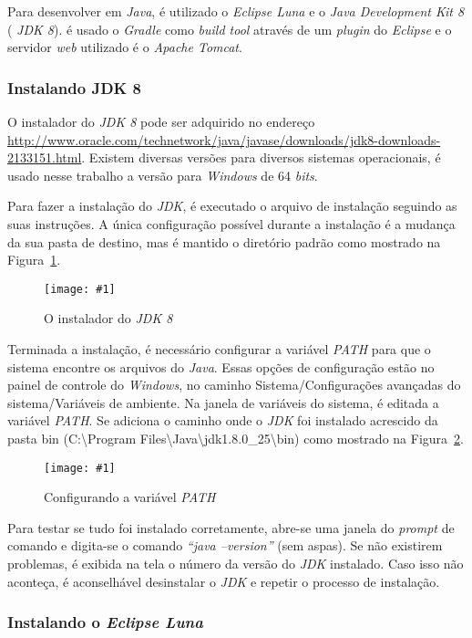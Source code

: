 \documentclass[a4paper,12pt]{article}
\newcommand{\figura}[3] {
	\begin{figure}[ht]
		\centering
		\texttt{[image: \#1]}
		\caption{#2}
		\label{#3}
	\end{figure}
	\FloatBarrier
}
\newcommand{\est}[1] {
\textit{#1}}
\newcommand{\sigla}[1] {
\textit{#1}}
\newcommand{\lang}[1] {
\textit{#1}}
\begin{document}
Para desenvolver em \lang{Java}, é utilizado o \est{Eclipse Luna} e o \est{Java Development Kit 8} (\sigla{JDK 8}). é usado o \est{Gradle} como \est{build tool} através de um \est{plugin} do \est{Eclipse} e o servidor \est{web} utilizado é o \est{Apache Tomcat}.

\subsubsection{Instalando JDK 8}

O instalador do \sigla{JDK 8} pode ser adquirido no endereço \url{http://www.oracle.com/technetwork/java/javase/downloads/jdk8-downloads-2133151.html}. Existem diversas versões para diversos sistemas operacionais, é usado nesse trabalho a versão para \est{Windows} de 64 \est{bits}. 

Para fazer a instalação do \sigla{JDK}, é executado o arquivo de instalação seguindo as suas instruções. A única configuração possível durante a instalação é a mudança da sua pasta de destino, mas é mantido o diretório padrão como mostrado na Figura~\ref{fig:jdk1}.

\figura{jdk81.jpg}{O instalador do \sigla{JDK 8}}{fig:jdk1}

Terminada a instalação, é necessário configurar a variável \est{PATH} para que o sistema encontre os arquivos do \lang{Java}. Essas opções de configuração estão no painel de controle do \est{Windows}, no caminho Sistema/Configurações avançadas do sistema/Variáveis de ambiente. Na janela de variáveis do sistema, é editada a variável \est{PATH}. Se adiciona o caminho onde o \sigla{JDK} foi instalado acrescido da pasta bin (C:\textbackslash Program Files\textbackslash Java\textbackslash jdk\textmd{1.8.0\_25}\textbackslash bin) como mostrado na Figura~\ref{fig:path}.

\figura{path1.png}{Configurando a variável \est{PATH}}{fig:path}

Para testar se tudo foi instalado corretamente, abre-se uma janela do \est{prompt} de comando e digita-se o comando \est{“java –version”} (sem aspas). Se não existirem problemas, é exibida na tela o número da versão do \sigla{JDK} instalado. Caso isso não aconteça, é aconselhável desinstalar o \sigla{JDK} e repetir o processo de instalação. 

\subsubsection{Instalando o \est{Eclipse Luna}} 
\end{document}
